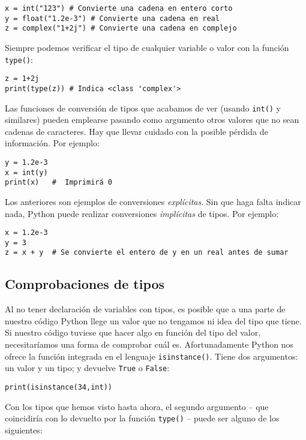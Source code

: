 \begin{lstlisting}
x = int("123") # Convierte una cadena en entero corto
y = float("1.2e-3") # Convierte una cadena en real
z = complex("1+2j") # Convierte una cadena en complejo
\end{lstlisting}

Siempre podemos verificar el tipo de cualquier variable o valor con la función \texttt{type()}:

\begin{lstlisting}
z = 1+2j
print(type(z)) # Indica <class 'complex'>
\end{lstlisting}

Las funciones de conversión de tipos que acabamos de ver (usando \texttt{int()} y similares) pueden emplearse pasando como argumento otros valores que no sean cadenas de caracteres. Hay que llevar cuidado con la posible pérdida de información. Por ejemplo:

\begin{lstlisting}
y = 1.2e-3
x = int(y)
print(x)   #  Imprimirá 0
\end{lstlisting}

Los anteriores son ejemplos de conversiones \emph{explícitas}. Sin que haga falta indicar nada, Python puede realizar conversiones \emph{implícitas} de tipos. Por ejemplo:

\begin{lstlisting}
x = 1.2e-3
y = 3
z = x + y  # Se convierte el entero de y en un real antes de sumar
\end{lstlisting}

\subsection{Comprobaciones de tipos}\label{sec:comp_tipos}

Al no tener declaración de variables con tipos, es posible que a una parte de nuestro código Python llege un valor que no tengamos ni idea del tipo que tiene. Si nuestro código tuviese que hacer algo en función del tipo del valor, necesitaríamos una forma de comprobar cuál es. Afortunadamente Python nos ofrece la función integrada en el lenguaje \texttt{isinstance()}. Tiene dos argumentos: un valor y un tipo; y devuelve \texttt{True} o \texttt{False}:

\begin{lstlisting}
print(isinstance(34,int))
\end{lstlisting}

Con los tipos que hemos visto hasta ahora, el segundo argumento -- que coincidiría con lo devuelto por la función \texttt{type()} -- puede ser alguno de los siguientes:

